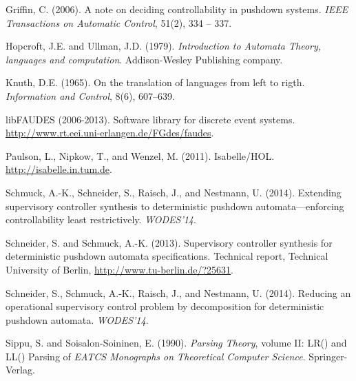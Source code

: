 \documentclass[draft]{ifacconf}
\begin{document}
\begin{thebibliography}{15}
Griffin, C. (2006).
\newblock A note on deciding controllability in pushdown systems.
\newblock \emph{IEEE Transactions on Automatic Control}, 51(2), 334 -- 337.

Hopcroft, J.E. and Ullman, J.D. (1979).
\newblock \emph{Introduction to Automata Theory, languages and computation}.
\newblock Addison-Wesley Publishing company.

Knuth, D.E. (1965).
\newblock On the translation of languages from left to rigth.
\newblock \emph{Information and Control}, 8(6), 607--639.

libFAUDES (2006-2013).
\newblock Software library for discrete event systems.
\newblock \urlprefix\url{http://www.rt.eei.uni-erlangen.de/FGdes/faudes}.

Paulson, L., Nipkow, T., and Wenzel, M. (2011).
\newblock Isabelle/{HOL}.
\newblock \urlprefix\url{http://isabelle.in.tum.de}.

Schmuck, A.-K., Schneider, S., Raisch, J., and Nestmann, U. (2014).
\newblock Extending supervisory controller synthesis to deterministic pushdown
  automata---enforcing controllability least restrictively.
\newblock \emph{WODES'14}.

Schneider, S. and Schmuck, A.-K. (2013).
\newblock Supervisory controller synthesis for deterministic pushdown automata
  specifications.
\newblock Technical report, Technical University of Berlin, \urlprefix\url{http://www.tu-berlin.de/?25631}.

Schneider, S., Schmuck, A.-K., Raisch, J., and Nestmann, U. (2014).
\newblock Reducing an operational supervisory control problem by decomposition
  for deterministic pushdown automata.
\newblock \emph{WODES'14}.

Sippu, S. and Soisalon-Soininen, E. (1990).
\newblock \emph{Parsing Theory}, volume II: {LR}() and {LL}() Parsing of
  \emph{EATCS Monographs on Theoretical Computer Science}.
\newblock Springer-Verlag.

\end{thebibliography}
 
\end{document}
